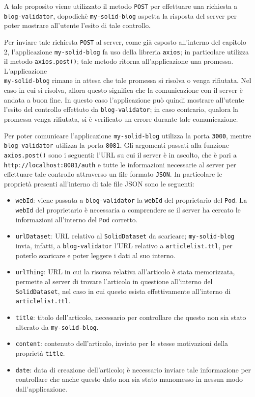 A tale proposito viene utilizzato il metodo {\tt POST} per effettuare una richiesta a\\{\tt blog-validator}, dopodichè {\tt my-solid-blog} aspetta la risposta del server per poter mostrare all'utente l'esito di tale controllo.

\bigskip


Per inviare tale richiesta {\tt POST} al server, come già esposto all'interno del capitolo 2, l'applicazione {\tt my-solid-blog} fa uso della libreria {\tt axios}; in particolare utilizza il metodo {\tt axios.post()}; tale metodo ritorna all'applicazione una promessa. L'applicazione\\{\tt my-solid-blog} rimane in attesa che tale promessa si risolva o venga rifiutata. Nel caso in cui si risolva, allora questo significa che la comunicazione con il server è andata a buon fine. In questo caso l'applicazione può quindi mostrare all'utente l'esito del controllo effettuto da {\tt blog-validator}; in caso contrario, qualora la promessa venga rifiutata, si è verificato un errore durante tale comunicazione.

\bigskip

Per poter comunicare l'applicazione {\tt my-solid-blog} utilizza la porta {\tt 3000}, mentre {\tt blog-validator} utilizza la porta {\tt 8081}. Gli argomenti passati alla funzione {\tt axios.post()} sono i seguenti: l'URL su cui il server è in ascolto, che è pari a {\tt http://localhost:8081/auth} e tutte le informazioni necessarie al server per effettuare tale controllo attraverso un file formato {\tt JSON}. In particolare le proprietà presenti all'interno di tale file JSON sono le seguenti:

\begin{itemize}
	\item {\tt webId}: viene passata a {\tt blog-validator} la {\tt webId} del proprietario del {\tt Pod}. La {\tt webId} del proprietario è necessaria a comprendere se il server ha cercato le informazioni all'interno del {\tt Pod} corretto.
	\item {\tt urlDataset}: URL relativo al {\tt SolidDataset} da scaricare; {\tt my-solid-blog} invia, infatti, a {\tt blog-validator} l'URL relativo a {\tt articlelist.ttl}, per poterlo scaricare e poter leggere i dati al suo interno.
	\item {\tt urlThing}: URL in cui la risorsa relativa all'articolo è stata memorizzata, permette al server di trovare l'articolo in questione all'interno del {\tt SolidDataset}, nel caso in cui questo esista effettivamente all'interno di {\tt articlelist.ttl}.
	\item {\tt title}: titolo dell'articolo, necessario per controllare che questo non sia stato alterato da {\tt my-solid-blog}.
	\item {\tt content}: contenuto dell'articolo, inviato per le stesse motivazioni della proprietà {\tt title}.
	\item {\tt date}: data di creazione dell'articolo; è necessario inviare tale informazione per controllare che anche questo dato non sia stato manomesso in nessun modo dall'applicazione.
\end{itemize}

